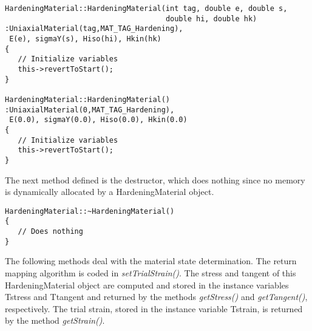 \documentclass[12pt]{article}
\begin{document}
{\sf\small
\begin{verbatim}
HardeningMaterial::HardeningMaterial(int tag, double e, double s,
                                     double hi, double hk)
:UniaxialMaterial(tag,MAT_TAG_Hardening),
 E(e), sigmaY(s), Hiso(hi), Hkin(hk)
{
   // Initialize variables
   this->revertToStart();
}

HardeningMaterial::HardeningMaterial()
:UniaxialMaterial(0,MAT_TAG_Hardening),
 E(0.0), sigmaY(0.0), Hiso(0.0), Hkin(0.0)
{
   // Initialize variables
   this->revertToStart();
}
\end{verbatim}
}

\noindent The next method defined is the destructor, which does nothing since no memory
is dynamically allocated by a HardeningMaterial object.

{\sf\small
\begin{verbatim}
HardeningMaterial::~HardeningMaterial()
{
   // Does nothing
}
\end{verbatim}
}

\noindent The following methods deal with the material state determination. The return
mapping algorithm is coded in {\em setTrialStrain()}. The stress and tangent of this
HardeningMaterial object are computed and stored in the instance variables Tstress
and Ttangent and returned by the methods {\em getStress()} and {\em getTangent()},
respectively. The trial strain, stored in the instance variable Tstrain, is returned
by the method {\em getStrain()}.
\end{document}
